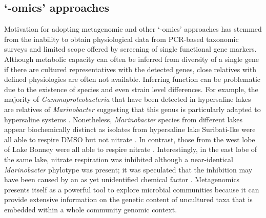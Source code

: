 \subsection{`-omics' approaches}
Motivation for adopting metagenomic and other `-omics' approaches has stemmed from the inability to obtain physiological data from \ac{PCR}-based taxonomic surveys and limited scope offered by screening of single functional gene markers.
Although metabolic capacity can often be inferred from diversity of a single gene if there are cultured representatives with the detected genes, close relatives with defined physiologies are often not available.
Inferring function can be problematic due to the existence of species and even strain level differences.
For example, the majority of \emph{Gammaproteobacteria} that have been detected in hypersaline lakes are relatives of \emph{Marinobacter} suggesting that this genus is particularly adapted to hypersaline systems \cite{Bowman2000b, Glatz2006, Matsuzaki2006, Mosier2007}.
Nonetheless, \emph{Marinobacter} species from different lakes appear biochemically distinct as isolates from hypersaline lake Suribati-Ike were all able to respire \ac{DMSO} but not nitrate \cite{Matsuzaki2006}. 
In contrast, those from the west lobe of Lake Bonney were all able to respire nitrate \cite{Ward1997}. 
Interestingly, in the east lobe of the same lake, nitrate respiration was inhibited although a near-identical \emph{Marinobacter} phylotype was present; it was speculated that the inhibition may have been caused by an as yet unidentified chemical factor \cite{Ward2005, Glatz2006}.
Metagenomics presents itself as a powerful tool to explore microbial communities because it can provide extensive information on the genetic content of uncultured taxa that is embedded within a whole community genomic context.
 
